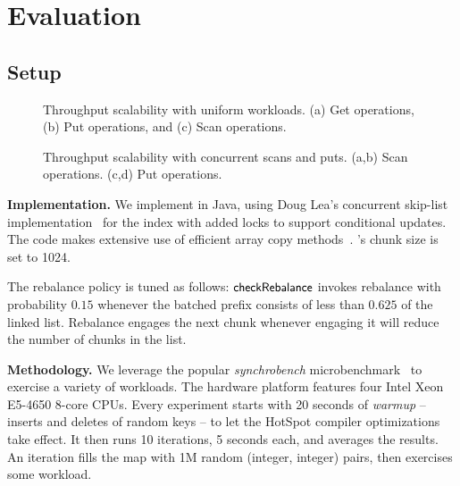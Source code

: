 \section{Evaluation}
\label{sec:eval}

\subsection{Setup}

\begin{figure*}
\begin{center}

\end{center}
\caption{Throughput scalability with uniform workloads. (a) Get operations, (b) Put operations, and (c) Scan operations. }
\label{evaluation:results:getputscan}
\end{figure*}

\begin{figure*}
\begin{center}

\end{center}
\caption{Throughput scalability with concurrent scans and puts. (a,b) Scan operations. (c,d) Put operations. }
\label{evaluation:results:scan}
\end{figure*}

{\bf Implementation.} We implement {\kiwi} in Java, using Doug Lea's concurrent skip-list 
implementation~\cite{JavaConcurrentSkipList} for the index with added locks to support conditional updates. 
The code makes extensive use of efficient 
array copy methods~\cite{JavaArrayCopy}. {\kiwi}'s chunk size is set to 1024. 

The rebalance policy is tuned as follows:
$\code{checkRebalance}$  invokes rebalance with probability $0.15$ whenever
 the batched prefix consists of less than $0.625$ of the linked list. Rebalance 
engages the next chunk whenever engaging it will reduce the number of chunks in the list. 

\textbf{Methodology.}
We leverage the popular {\em synchrobench}  microbenchmark~\cite{Gramoli2015}
to exercise a variety of workloads. The hardware platform %
features four Intel Xeon E5-4650 8-core CPUs. %
Every experiment starts with 20 seconds of {\em warmup} -- inserts
and deletes of random keys -- to let the HotSpot compiler optimizations take effect. 
It then runs 10  iterations, 5 seconds each, and averages the results. An iteration fills the map with 1M random (integer, integer) pairs, 
then exercises some workload. %


